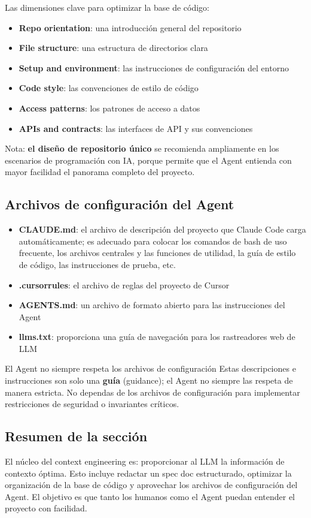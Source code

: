 Las dimensiones clave para optimizar la base de código:
\begin{itemize}
    \item \textbf{Repo orientation}: una introducción general del repositorio
    \item \textbf{File structure}: una estructura de directorios clara
    \item \textbf{Setup and environment}: las instrucciones de configuración del entorno
    \item \textbf{Code style}: las convenciones de estilo de código
    \item \textbf{Access patterns}: los patrones de acceso a datos
    \item \textbf{APIs and contracts}: las interfaces de API y sus convenciones
\end{itemize}

Nota: \textbf{el diseño de repositorio único} se recomienda ampliamente en los escenarios de programación con IA, porque permite que el Agent entienda con mayor facilidad el panorama completo del proyecto.

\subsection{Archivos de configuración del Agent}

\begin{itemize}
    \item \textbf{CLAUDE.md}: el archivo de descripción del proyecto que Claude Code carga automáticamente; es adecuado para colocar los comandos de bash de uso frecuente, los archivos centrales y las funciones de utilidad, la guía de estilo de código, las instrucciones de prueba, etc.
    \item \textbf{.cursorrules}: el archivo de reglas del proyecto de Cursor
    \item \textbf{AGENTS.md}: un archivo de formato abierto para las instrucciones del Agent
    \item \textbf{llms.txt}: proporciona una guía de navegación para los rastreadores web de LLM
\end{itemize}

\begin{warningbox}{El Agent no siempre respeta los archivos de configuración}
Estas descripciones e instrucciones son solo una \textbf{guía} (guidance); el Agent no siempre las respeta de manera estricta. No dependas de los archivos de configuración para implementar restricciones de seguridad o invariantes críticos.
\end{warningbox}

\subsection{Resumen de la sección}

El núcleo del context engineering es: proporcionar al LLM la información de contexto óptima. Esto incluye redactar un spec doc estructurado, optimizar la organización de la base de código y aprovechar los archivos de configuración del Agent. El objetivo es que tanto los humanos como el Agent puedan entender el proyecto con facilidad.
